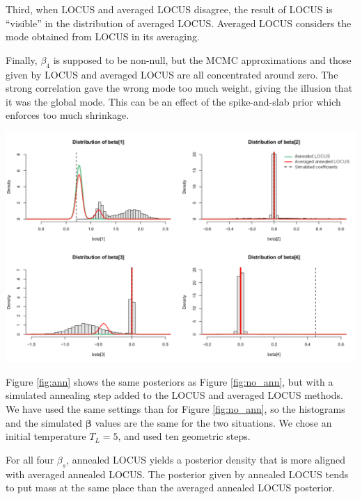 \documentclass[final]{beamer}
\newenvironment{Figure}
  {\par\noindent\minipage{\linewidth}}
  {\endminipage\par}
\begin{document}
\begin{multicols*}{3}
Third, when LOCUS and averaged LOCUS disagree, the result of LOCUS is ``visible'' in the distribution of averaged LOCUS. Averaged LOCUS considers the mode obtained from LOCUS in its averaging.

Finally, $\beta_4$ is supposed to be non-null, but the MCMC approximations and those given by LOCUS and averaged LOCUS are all concentrated around zero. The strong correlation gave the wrong mode too much weight, giving the illusion that it was the global mode. This can be an effect of the spike-and-slab prior which enforces too much shrinkage.

\begin{Figure}
\centering
\includegraphics[width=6in, bb=0 0 800px 600px]{images/annealing.pdf}
\end{Figure}
\vspace{1em}
Figure \ref{fig:ann} shows the same posteriors as Figure \ref{fig:no_ann}, but with a simulated annealing step added to the LOCUS and averaged LOCUS methods. We have used the same settings than for Figure \ref{fig:no_ann}, so the histograms and the simulated $
\boldsymbol{\beta}$ values are the same for the two situations. We chose an initial temperature $T_L = 5$, and used ten geometric steps.

For all four $\beta_s$, annealed LOCUS yields a posterior density that is more aligned with averaged annealed LOCUS. The posterior given by annealed LOCUS tends to put mass at the same place than the averaged annealed LOCUS posterior.


\end{multicols*}
\end{document}
